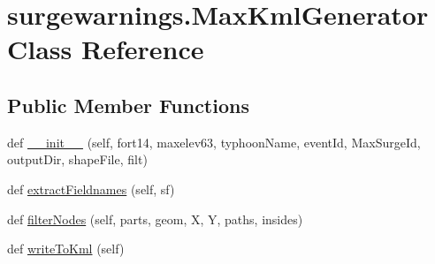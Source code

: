 \hypertarget{classsurgewarnings_1_1_max_kml_generator}{}\section{surgewarnings.\+Max\+Kml\+Generator Class Reference}
\label{classsurgewarnings_1_1_max_kml_generator}
\subsection*{Public Member Functions}
\begin{DoxyCompactItemize}
\item 
def \hyperlink{classsurgewarnings_1_1_max_kml_generator_acde57ffb3d3546bfe062ed20e5b431f8}{\+\_\+\+\_\+init\+\_\+\+\_\+} (self, fort14, maxelev63, typhoon\+Name, event\+Id, Max\+Surge\+Id, output\+Dir, shape\+File, filt)
\item 
def \hyperlink{classsurgewarnings_1_1_max_kml_generator_aa2899674f37f5c783f4cb9b820ab2a1a}{extract\+Fieldnames} (self, sf)
\item 
def \hyperlink{classsurgewarnings_1_1_max_kml_generator_a3a3f01432a3e16dea9265078a3aa435d}{filter\+Nodes} (self, parts, geom, X, Y, paths, insides)
\item 
def \hyperlink{classsurgewarnings_1_1_max_kml_generator_abb06764ec2b0a04cb404eca18cf6c89c}{write\+To\+Kml} (self)
\end{DoxyCompactItemize}
